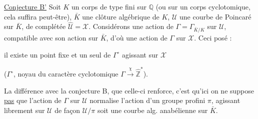 \uline{Conjecture B'} Soit $K$ un corps de type fini sur $\mathbb{Q}$ (ou sur un corps cyclotomique, cela suffira peut-être), $\bar K$ une clôture algébrique de $K$, $\mathcal U$ une courbe de Poincaré sur $\bar K$, de complétée $\widehat{\mathcal U}=\mathcal X$. Considérons une action de $\Gamma=\Gamma_{\bar K/K}$ sur $\mathcal U$, compatible avec son action sur $\bar K$, d'où une action de $\Gamma$ sur $\mathcal X$. Ceci posé :

il existe un point fixe et un seul de $\Gamma^\circ$ agissant sur $\mathcal X$

($\Gamma^\circ$, noyau du caractère cyclotomique $\Gamma\xrightarrow{\chi}\widehat{\mathbb Z}^{\!*}$).

La différence avec la conjecture B, que celle-ci renforce, c'est qu'ici on ne suppose \uline{pas} que l'action de $\Gamma$ sur $\mathcal U$ normalise l'action d'un groupe profini $\pi$, agissant librement sur $\mathcal U$ de façon  $\mathcal U/\pi$ soit une courbe alg. anabélienne sur $\bar K$.
